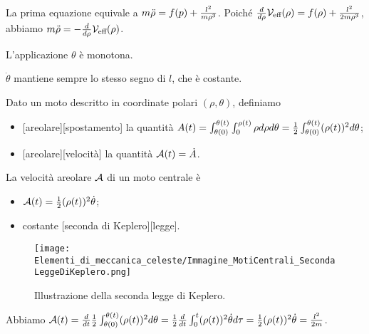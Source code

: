 \par La prima equazione equivale a $m \ddot{\rho} = f(p) + \frac{l^2}{m \rho^3}$. Poich\'e $\frac{d }{d \rho} \mathcal{V}_{\text{eff}}(\rho) = f(\rho) + \frac{l^2}{2m\rho^3}$, abbiamo $m \ddot{\rho} = - \frac{d }{d \rho} \mathcal{V}_{\text{eff}}(\rho)$. \EndProof
\begin{Corollary}
	L'applicazione $\theta$ \`e monotona.
\end{Corollary}
\Proof $\dot{\theta}$ mantiene sempre lo stesso segno di $l$, che \`e costante. \EndProof
\begin{Definition}
	Dato un moto descritto in coordinate polari $(\rho,\theta)$, definiamo
	\begin{itemize}
		\item {}[areolare][spostamento] la quantit\`a
	$A(t) =
	\int_{\theta(0)}^{\theta(t)} \int_0^{\rho(t)} \rho d\rho d\theta =
	\frac{1}{2} \int_{\theta(0)}^{\theta(t)} (\rho(t))^2 d\theta$;
		\item {}[areolare][velocit\`a] la quantit\`a $\mathcal{A}(t) = \dot{A}$.
	\end{itemize}
\end{Definition}
\begin{Theorem}
	La velocit\`a areolare $\mathcal{A}$ di un moto centrale \`e
	\begin{itemize}
		\item $\mathcal{A}(t) = \frac{1}{2} (\rho(t))^2\dot{\theta}$;
		\item costante [seconda di Keplero][legge]. 
	\end{itemize}
\end{Theorem}
\begin{figure}
	\texttt{[image: Elementi\_di\_meccanica\_celeste/Immagine\_MotiCentrali\_SecondaLeggeDiKeplero.png]}
	\centering
	\caption{Illustrazione della seconda legge di Keplero.}
\end{figure}
\Proof Abbiamo
$\mathcal{A}(t) =
\frac{d }{d t} \frac{1}{2} \int_{\theta(0)}^{\theta(t)} (\rho(t))^2 d\theta =
\frac{1}{2} \frac{d }{d t} \int_0^t (\rho(t))^2 \dot{\theta} d\tau =
\frac{1}{2} (\rho(t))^2 \dot{\theta} =
\frac{l^2}{2m}$. \EndProof
